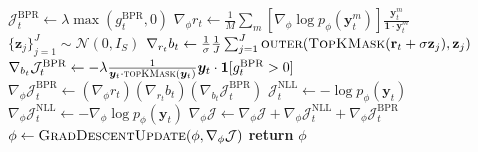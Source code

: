 \begin{algorithm}[!h]
\begin{algorithmic}[1]
        \STATE $\mathcal{J}_t^{\text{BPR}} \gets \lambda \max ( g_t^{\text{BPR}}, 0)$ 
        \STATE
        \STATE $\nabla_{\phi} r_t \gets \frac{1}{M} \sum_{m} [\nabla_{\phi} \log p_{\phi}(\bm{y}_t^m) ] \frac{\bm{y}_t^m}{\bm{1} \cdot \bm{y}_t^m}$ 
        \STATE $\{ \mathbf{z}_j \}_{j=1}^J \sim \mathcal{N}(0, I_S)$
        \STATE $\nabla_{r_t} b_t \gets \frac{1}{\sigma}  \frac{1}{J} \sum_{j=1}^J \textsc{outer}( \textsc{TopKMask}(\mathbf{r}_t + \sigma \mathbf{z}_j), \mathbf{z}_j )$        
        \STATE $\nabla_{b_t}\mathcal{J}^{\text{BPR}}_t \gets - \lambda \frac{1}{\bm{y}_t \cdot \textsc{topKMask}(\bm{y}_t)} \bm{y}_t \cdot \mathbf{1}[g_{t}^{\text{BPR}} > 0]$
        \STATE $\nabla_{\phi}\mathcal{J}^{\text{BPR}}_t \gets \left( \nabla_{\phi} r_t \right) \left( \nabla_{r_t} b_t \right) \left( \nabla_{b_t}\mathcal{J}^{\text{BPR}}_t\right)$ 
        \STATE        
        \STATE $\mathcal{J}_t^\text{NLL} \gets -\log p_{\phi}(\bm{y}_t) $ 
        \STATE $\nabla_{\phi}\mathcal{J}_t^{\text{NLL}} \gets -\nabla_\phi \log p_{\phi}(\bm{y}_t)$
        \STATE        
        \STATE $\nabla_{\phi}{\mathcal{J}} \gets \nabla_{\phi}{\mathcal{J}} + \nabla_{\phi} \mathcal{J}^{\text{NLL}}_t + \nabla_{\phi}\mathcal{J}^{\text{BPR}}_t$
    \ENDFOR
    \STATE $\phi \gets \textsc{GradDescentUpdate}(\phi,  \nabla_{\phi}{\mathcal{J}})$ 
\ENDWHILE
\STATE \textbf{return} $\phi$
\end{algorithmic}
\end{algorithm}




